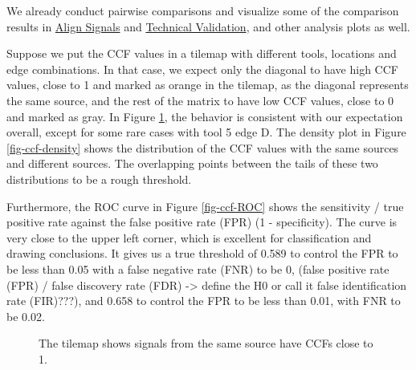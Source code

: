 \documentclass[fleqn,10pt]{wlscirep}
\newcommand{\tom}[1]{{\textcolor{RedOrange}{#1}}}
\begin{document}
\begin{table}
{}

\end{table}%

We already conduct pairwise comparisons and visualize some of the
comparison results in \hyperref[sec-align-signals]{Align Signals} and
\hyperref[sec-technical-validation]{Technical Validation}, and other
analysis plots as well.

Suppose we put the CCF values in a tilemap with different tools,
locations and edge combinations. In that case, we expect only the
diagonal to have high CCF values, close to 1 and marked as orange in the
tilemap, as the diagonal represents the same source, and the rest of the
matrix to have low CCF values, close to 0 and marked as gray. In Figure
\ref{fig-ccf-tilemap}, the behavior is consistent with our expectation
overall, except for some rare cases with tool 5 edge D. The density plot
in Figure \ref{fig-ccf-density} shows the distribution of the CCF values
with the same sources and different sources. The overlapping points
between the tails of these two distributions to be a rough threshold.

Furthermore, the ROC curve in Figure \ref{fig-ccf-ROC} shows the
sensitivity / true positive rate against the false positive rate (FPR)
(1 - specificity). The curve is very close to the upper left corner,
which is excellent for classification and drawing conclusions. It gives
us a true threshold of 0.589 to control the FPR to be less than 0.05
with a false negative rate (FNR) to be 0,
\tom{(false positive rate (FPR) / false discovery rate (FDR) -> define the H0 or call it false identification rate (FIR)???)},
and 0.658 to control the FPR to be less than 0.01, with FNR to be 0.02.

\begin{figure}


\caption{\label{fig-ccf-tilemap}The tilemap shows signals from the same
source have CCFs close to 1.}

\end{figure}%
\end{document}
